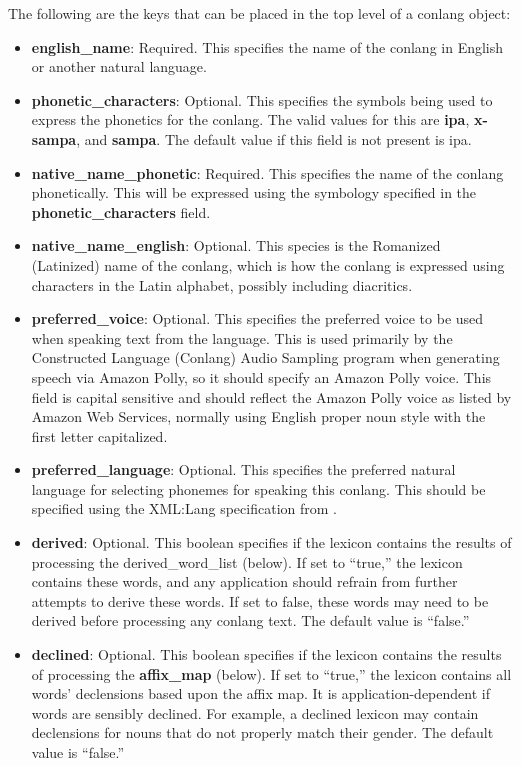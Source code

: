 The following are the keys that can be placed in the top level of a conlang object:
\begin{itemize}
	\item \textbf{english\_name}: Required.  This specifies the name of the conlang in English or another natural language.
	\item \textbf{phonetic\_characters}: Optional.  This specifies the symbols being used to express the phonetics for the conlang.  The valid values for this are \textbf{ipa}, \textbf{x-sampa}, and \textbf{sampa}.  The default value if this field is not present is ipa.
	\item \textbf{native\_name\_phonetic}: Required. This specifies the name of the conlang phonetically.  This will be expressed using the symbology specified in the \textbf{phonetic\_characters} field.
	\item \textbf{native\_name\_english}: Optional.  This species is the Romanized (Latinized) name of the conlang, which is how the conlang is expressed using characters in the Latin alphabet, possibly including diacritics.
	\item \textbf{preferred\_voice}: Optional. This specifies the preferred voice to be used when speaking text from the language.  This is used primarily by the Constructed Language (Conlang) Audio Sampling program when generating speech via Amazon Polly, so it should specify an Amazon Polly voice.  This field is capital sensitive and should reflect the Amazon Polly voice as listed by Amazon Web Services, normally using English proper noun style with the first letter capitalized.
	\item \textbf{preferred\_language}: Optional.  This specifies the preferred natural language for selecting phonemes for speaking this conlang.  This should be specified using the XML:Lang specification from \cite{froumentinW3CSpeechInterface2005}.
	\item \textbf{derived}: Optional. This boolean specifies if the lexicon contains the results of processing the derived\_word\_list (below).  If set to ``true,'' the lexicon contains these words, and any application should refrain from further attempts to derive these words.  If set to false, these words may need to be derived before processing any conlang text.  The default value is ``false.''
	\item \textbf{declined}: Optional. This boolean specifies if the lexicon contains the results of processing the \textbf{affix\_map} (below). If set to ``true,'' the lexicon contains all words' declensions based upon the affix map.  It is application-dependent if words are sensibly declined.  For example, a declined lexicon may contain declensions for nouns that do not properly match their gender.  The default value is ``false.''

\end{itemize}

